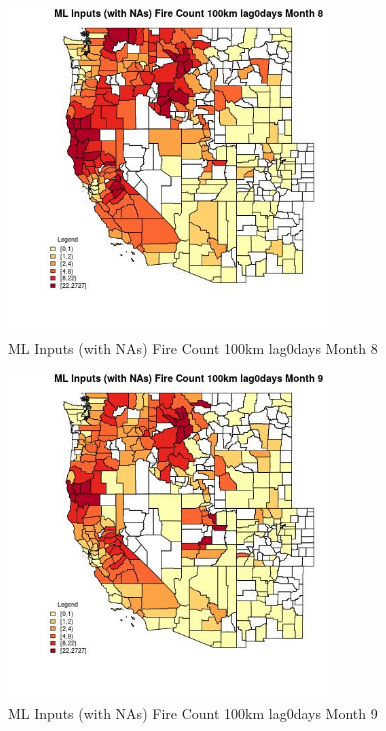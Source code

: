 \begin{figure} 
\centering  
\includegraphics[width=0.77\textwidth]{Code_Outputs/Report_ML_input_PM25_Step4_part_f_de_duplicated_aveswNAs_CountyFire_Count_100km_lag0daysmedianMonth8.jpg} 
\caption{\label{fig:Report_ML_input_PM25_Step4_part_f_de_duplicated_aveswNAsCountyFire_Count_100km_lag0daysmedianMonth8}ML Inputs (with NAs) Fire Count 100km lag0days Month 8} 
\end{figure} 
 

\begin{figure} 
\centering  
\includegraphics[width=0.77\textwidth]{Code_Outputs/Report_ML_input_PM25_Step4_part_f_de_duplicated_aveswNAs_CountyFire_Count_100km_lag0daysmedianMonth9.jpg} 
\caption{\label{fig:Report_ML_input_PM25_Step4_part_f_de_duplicated_aveswNAsCountyFire_Count_100km_lag0daysmedianMonth9}ML Inputs (with NAs) Fire Count 100km lag0days Month 9} 
\end{figure} 
 

